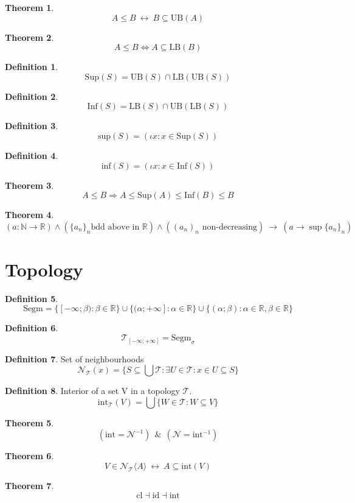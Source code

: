 \documentclass[10pt,a4paper]{article}
\theoremstyle{definition}
\newtheorem{definition}{Definition}[section]
\newtheorem{theorem}{Theorem}[section]
\newcommand*{\separation}[3]{%
  \{#1\in #2: #3\}
}
\newcommand{\AND}{\ \ \&\ \ }
\newcommand{\closure}{\mbox{cl}}
\newcommand{\converges}{\longrightarrow}
\renewcommand{\iff}{\ \longleftrightarrow\ }
\renewcommand{\implies}{\ \longrightarrow\ }
\newcommand{\Inf}{\mathrm{Inf}}
\newcommand{\interior}{\mbox{int}}
\newcommand{\LB}{\mathrm{LB}}
\newcommand{\nghbset}{\mathcal{N}}
\newcommand{\real}{\mathbb{R}}
\newcommand{\Sup}{\mathrm{Sup}}
\newcommand{\topology}{\mathcal{T}}
\newcommand{\union}{\bigcup}
\newcommand{\UB}{\mathrm{UB}}
\begin{document}
\begin{theorem}
\[
A\leqslant B \iff B\subseteq \UB(A)
\]
\end{theorem}
\begin{theorem}
\[
A\leqslant B \Longleftrightarrow A\subseteq \LB(B)
\]
\end{theorem}

\begin{definition}
\[
\Sup(S) = \UB(S)\cap \LB(\UB(S))
\]
\end{definition}
\begin{definition}
\[
\Inf(S) = \LB(S)\cap \UB(\LB(S))
\]
\end{definition}


\begin{definition}
\[
\mbox{sup}(S) = (\iota x: x\in \mathrm{Sup}(S))
\]
\end{definition}
\begin{definition}
\[
\mbox{inf}(S) = (\iota x: x\in \mathrm{Inf}(S))
\]
\end{definition}


\begin{theorem}
\[
A \leqslant B \Longrightarrow A\leqslant \Sup(A)\leqslant \Inf(B)\leqslant B
\]
\end{theorem}


\begin{theorem}
\[
(a:\mathbb{N}\rightarrow \real)
\land
(\{a_n\}_n \mbox{bdd above in }\real)
\land
((a_n)_n\mbox{ non-decreasing})
\implies 
(a \converges \sup \{a_n\}_n)
\]
\end{theorem}
\section{Topology}
\begin{definition}
\[
\mbox{Segm} = \{[-\infty;\beta):\beta\in\real\}\cup \{(\alpha;+\infty]:\alpha\in\real\}\cup \{(\alpha;\beta):\alpha\in\real,\beta\in\real\}
\]
\end{definition}
\begin{definition}
\[
\topology_{[-\infty;+\infty]} = \mbox{Segm}_\sigma
\]
\end{definition}
\begin{definition}
Set of neighbourhoods
\[
\nghbset_\topology(x) = \{S \subseteq \union \topology : \exists  U\in \topology: x\in U \subseteq S \}
\]
\end{definition}
\begin{definition}
Interior of a set V in a topology $\topology$.
\[
\interior_\topology(V) = \union
\separation{W}{\topology}{W\subseteq V}
\]
\end{definition}
\begin{theorem}
\[
(\interior = \nghbset^{-1})\AND(\nghbset=\interior^{-1})
\]
\end{theorem}
\begin{theorem}
\[
V\in \nghbset_\topology\langle A\rangle \iff A \subseteq \interior(V)
\]
\end{theorem}
\begin{theorem}
\[
\closure \dashv \mbox{id} \dashv \interior
\]
\end{theorem}
\end{document}
